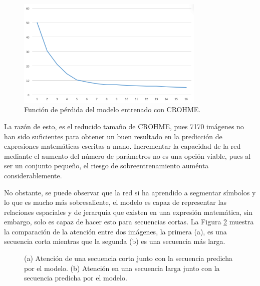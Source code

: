 \begin{figure}[H]
    \centering
    \includegraphics[width=0.8\textwidth]{capitulo5/modelo/img/modelo-crohme-loss}
    \caption{Función de pérdida del modelo entrenado con CROHME.}
    \label{fig:modelo-crohme-loss}
\end{figure}

La razón de esto, es el reducido tamaño de CROHME, pues 7170 imágenes no han sido suficientes para obtener un buen resultado en la predicción de expresiones matemáticas escritas a mano. Incrementar la capacidad de la red mediante el aumento del número de parámetros no es una opción viable, pues al ser un conjunto pequeño, el riesgo de sobreentrenamiento auménta considerablemente.

No obstante, se puede observar que la red si ha aprendido a segmentar símbolos y lo que es mucho más sobresaliente, el modelo es capaz de representar las relaciones espaciales y de jerarquía que existen en una expresión matemática, sin embargo, solo es capaz de hacer esto para secuencias cortas. La Figura \ref{fig:modelo-crohme-attention} muestra la comparación de la atención entre dos imágenes, la primera (a), es una secuencia corta mientras que la segunda (b) es una secuencia más larga. 

\begin{figure}[H]
    \centering
    \caption{(a) Atención de una secuencia corta junto con la secuencia predicha por el modelo. (b) Atención en una secuencia larga junto con la secuencia predicha por el modelo.}
    \label{fig:modelo-crohme-attention}
\end{figure} 

